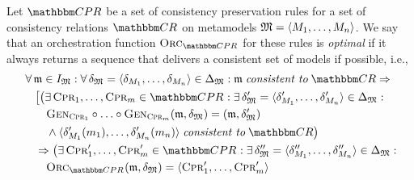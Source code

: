 \begin{definition}
    Let $\consistencypreservationruleset{}$ be a set of consistency preservation rules for a set of consistency relations $\consistencyrelationset{CR}$ on metamodels $\mathfrak{M} = \langle M_{1}, \dots, M_{n} \rangle$.
    We say that an orchestration function $\orcfunction{\consistencypreservationruleset{}}$ for these rules is \emph{optimal} if it always returns a sequence that delivers a consistent set of models if possible, i.e.,
    \begin{align*}
        &
        \forall \modeltuple{m} \in \metamodeltupleinstanceset{M} : \forall \changetuple{\metamodeltuple{M}} = \tupled{\change{\metamodel{M}{1}}, \dots, \change{\metamodel{M}{n}}} \in \changeuniverse{\metamodeltuple{M}} :
        \modeltuple{m} \consistenttomath \consistencyrelationset{CR} \Rightarrow \\
        & \formulaskip
        \bigl[ \bigl(
            \exists \consistencypreservationrule{1}, \dots, \consistencypreservationrule{m} \in \consistencypreservationruleset{} : 
            \exists \changetuple{\metamodeltuple{M}}' = \tupled{\change{\metamodel{M}{1}}', \dots, \change{\metamodel{M}{n}}'} \in \changeuniverse{\metamodeltuple{M}} :\\
            & \formulaskip \formulaskip
            \generalizationfunction{\consistencypreservationrule{1}} \concatfunction \dots \concatfunction \generalizationfunction{\consistencypreservationrule{m}}(\modeltuple{m}, \changetuple{\metamodeltuple{M}}) = (\modeltuple{m}, \changetuple{\metamodeltuple{M}}')\\
            & \formulaskip \formulaskip
            \land \tupled{\change{\metamodel{M}{1}}'(\model{m}{1}), \dots, \change{\metamodel{M}{n}}'(\model{m}{n})} \consistenttomath \consistencyrelationset{CR} \bigr) \\
            & \formulaskip
            \Rightarrow \bigl(        
            \exists \consistencypreservationrule{1}', \dots, \consistencypreservationrule{m}' \in \consistencypreservationruleset{} : 
            \exists \changetuple{\metamodeltuple{M}}'' = \tupled{\change{\metamodel{M}{1}}'', \dots, \change{\metamodel{M}{n}}''} \in \changeuniverse{\metamodeltuple{M}} :\\
            & \formulaskip \formulaskip
            \orcfunction{\consistencypreservationruleset{}}(\modeltuple{m}, \changetuple{\metamodeltuple{M}}) = \tupled{\consistencypreservationrule{1}', \dots, \consistencypreservationrule{m}'} \\

\end{align*}
\end{definition}
